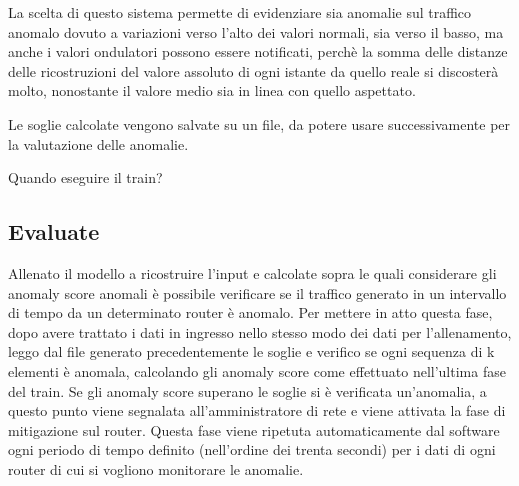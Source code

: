 La scelta di questo sistema permette di evidenziare sia anomalie sul traffico anomalo dovuto a variazioni verso l'alto dei valori normali, sia verso il basso, ma anche i valori ondulatori possono essere notificati, perchè la somma delle distanze delle ricostruzioni del valore assoluto di ogni istante da quello reale si discosterà molto, nonostante il valore medio sia in linea con quello aspettato.

Le soglie calcolate vengono salvate su un file, da potere usare successivamente per la valutazione delle anomalie.

Quando eseguire il train?






\subsection{Evaluate}
Allenato il modello a ricostruire l'input e calcolate sopra le quali considerare gli anomaly score anomali è possibile verificare se il traffico generato in un intervallo di tempo da un determinato router è anomalo.  
Per mettere in atto questa fase, dopo avere trattato i dati in ingresso nello stesso modo dei dati per l'allenamento, leggo dal file generato precedentemente le soglie e verifico se ogni sequenza di k elementi è anomala, calcolando gli anomaly score come effettuato nell'ultima fase del train. Se gli anomaly score superano le soglie si è verificata un'anomalia, a questo punto viene segnalata all'amministratore di rete e viene attivata la fase di mitigazione sul router.
Questa fase viene ripetuta automaticamente dal software ogni periodo di tempo definito (nell'ordine dei trenta secondi) per i dati di ogni router di cui si vogliono monitorare le anomalie.


